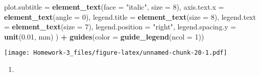 \documentclass[
]{article}
\newenvironment{Shaded}{\begin{snugshade}}{\end{snugshade}}
\newcommand{\AttributeTok}[1]{\textcolor[rgb]{0.13,0.29,0.53}{#1}}
\newcommand{\DecValTok}[1]{\textcolor[rgb]{0.00,0.00,0.81}{#1}}
\newcommand{\FloatTok}[1]{\textcolor[rgb]{0.00,0.00,0.81}{#1}}
\newcommand{\FunctionTok}[1]{\textcolor[rgb]{0.13,0.29,0.53}{\textbf{#1}}}
\newcommand{\NormalTok}[1]{#1}
\newcommand{\SpecialCharTok}[1]{\textcolor[rgb]{0.81,0.36,0.00}{\textbf{#1}}}
\newcommand{\StringTok}[1]{\textcolor[rgb]{0.31,0.60,0.02}{#1}}
\providecommand{\tightlist}{%
  \setlength{\itemsep}{0pt}\setlength{\parskip}{0pt}}
\begin{document}
\begin{Shaded}
\begin{Highlighting}[]
    \AttributeTok{plot.subtitle =} \FunctionTok{element\_text}\NormalTok{(}\AttributeTok{face =} \StringTok{"italic"}\NormalTok{, }\AttributeTok{size =} \DecValTok{8}\NormalTok{),  }
    \AttributeTok{axis.text.x =} \FunctionTok{element\_text}\NormalTok{(}\AttributeTok{angle =} \DecValTok{0}\NormalTok{),  }
    \AttributeTok{legend.title =} \FunctionTok{element\_text}\NormalTok{(}\AttributeTok{size =} \DecValTok{8}\NormalTok{),}
    \AttributeTok{legend.text =} \FunctionTok{element\_text}\NormalTok{(}\AttributeTok{size =} \DecValTok{7}\NormalTok{),}
    \AttributeTok{legend.position =} \StringTok{"right"}\NormalTok{,}
    \AttributeTok{legend.spacing.y =} \FunctionTok{unit}\NormalTok{(}\FloatTok{0.01}\NormalTok{, }\StringTok{\textquotesingle{}mm\textquotesingle{}}\NormalTok{)  }
\NormalTok{  ) }\SpecialCharTok{+}
  \FunctionTok{guides}\NormalTok{(}\AttributeTok{color =} \FunctionTok{guide\_legend}\NormalTok{(}\AttributeTok{ncol =} \DecValTok{1}\NormalTok{))  }
\end{Highlighting}
\end{Shaded}

\texttt{[image: Homework-3\_files/figure-latex/unnamed-chunk-20-1.pdf]}

\begin{enumerate}
\def\labelenumi{\arabic{enumi}.}
\setcounter{enumi}{2}
\tightlist
\item
\end{enumerate}
\end{document}
